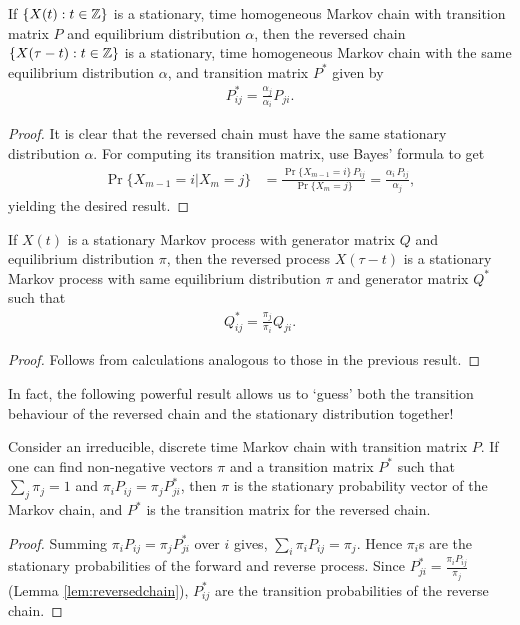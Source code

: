 \documentclass[a4paper,10pt,english]{article}
\begin{document}
\begin{lem}  
\label{lem:reversedchain}
If $\{X(t): t \in \mathbb{Z}\}$ is a stationary, time homogeneous Markov chain with transition matrix $P$ and equilibrium distribution $\alpha$, 
then the reversed chain $\{X(\tau -t): t \in \mathbb{Z}\}$ is a stationary, time homogeneous Markov chain with the same equilibrium distribution $\alpha$, and transition matrix $P^{\ast}$ given by
\begin{align*}
P^{\ast}_{ij} = \frac{\alpha_j}{\alpha_i}P_{ji}.
\end{align*}
\end{lem}
\begin{proof} 
It is clear that the reversed chain must have the same stationary distribution $\alpha$. For computing its transition matrix, use Bayes' formula to get
\begin{align*}
\Pr\{X_{m-1}=i|X_m=j\} &= \frac{\Pr\{X_{m-1}=i\} \, P_{ij}  }{ \Pr\{X_{m}=j\} } =\frac{\alpha_i \, P_{ij}  }{ \alpha_j },
\end{align*}
yielding the desired result. 
\end{proof}

\begin{lem} 
If $X(t)$ is a stationary Markov process with generator matrix $Q$ and equilibrium distribution $\pi$, then the reversed process $X(\tau -t)$ is a stationary Markov process with same equilibrium distribution $\pi$ and generator matrix $Q^{\ast}$ such that
\begin{align*}
Q^{\ast}_{ij} = \frac{\pi_j}{\pi_i}Q_{ji}.
\end{align*}
\end{lem}
\begin{proof} 
Follows from calculations analogous to those in the previous result. 
\end{proof}

In fact, the following powerful result allows us to `guess' both the transition behaviour of the reversed chain and the stationary distribution together!

\begin{thm}
\label{thm:guessReversal}
Consider an irreducible, discrete time Markov chain with transition matrix $P$. If one can find non-negative vectors $\pi$ and a transition matrix $P^\ast$ such that $\sum_j \pi_j =1$ and $\pi_iP_{ij}=\pi_jP^*_{ji}$, then $\pi$ is the stationary probability vector of the Markov chain, and $P^*$ is the transition matrix for the reversed chain.
\end{thm}
\begin{proof}
Summing $\pi_iP_{ij}=\pi_jP_{ji}^*$ over $i$ gives, $\sum_{i}\pi_iP_{ij}=\pi_j$. Hence $\pi_i$s are the stationary probabilities of the forward and reverse process. Since $P_{ji}^*=\frac{\pi_iP_{ij}}{\pi_j}$ (Lemma \ref{lem:reversedchain}), $P_{ij}^*$ are the transition probabilities of the reverse chain.
\end{proof} 
\end{document}
